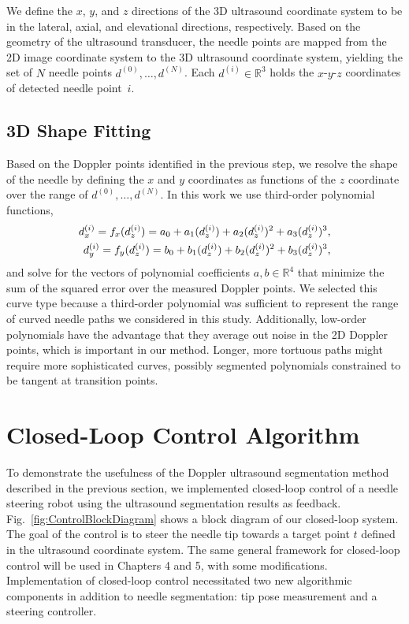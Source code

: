 We define the $x$, $y$, and $z$ directions of the 3D ultrasound coordinate system to be in the lateral, axial, and elevational directions, respectively. Based on the geometry of the ultrasound transducer, the needle points are mapped from the 2D image coordinate system to the 3D ultrasound coordinate system, yielding the set of $N$ needle points $d^{(0)}, \dotsc, d^{(N)}$. Each $d^{(i)} \in \mathbb{R}^{3}$ holds the $x$-$y$-$z$ coordinates of detected needle point~$i$.

\subsection{3D Shape Fitting}
Based on the Doppler points identified in the previous step, we resolve the shape of the needle by defining the $x$ and $y$ coordinates as functions of the $z$ coordinate over the range of $d^{(0)}, \dotsc, d^{(N)}$. In this work we use third-order polynomial functions,
\begin{align}
d^{(i)}_x = f_x(d_z^{(i)}) = a_0 + a_1(d_z^{(i)}) + a_2(d_z^{(i)})^{2} + a_3(d_z^{(i)})^{3},\notag\\
d^{(i)}_y = f_y(d_z^{(i)}) = b_0 + b_1(d_z^{(i)}) + b_2(d_z^{(i)})^{2} + b_3(d_z^{(i)})^{3},\label{result}
\end{align}
and solve for the vectors of polynomial coefficients $a,b \in \mathbb{R}^{4}$ that minimize the sum of the squared error over the measured Doppler points. We selected this curve type because a third-order polynomial was sufficient to represent the range of curved needle paths we considered in this study. Additionally, low-order polynomials have the advantage that they average out noise in the 2D Doppler points, which is important in our method. Longer, more tortuous paths might require more sophisticated curves, possibly segmented polynomials constrained to be tangent at transition points.

\section{Closed-Loop Control Algorithm}
\label{sec:Closed-loopControlDoppler}
To demonstrate the usefulness of the Doppler ultrasound segmentation method described in the previous section, we implemented closed-loop control of a needle steering robot using the ultrasound segmentation results as feedback. Fig.~\ref{fig:ControlBlockDiagram} shows a block diagram of our closed-loop system. The goal of the control is to steer the needle tip towards a target point ${t}$ defined in the ultrasound coordinate system. The same general framework for closed-loop control will be used in Chapters 4 and 5, with some modifications. Implementation of closed-loop control necessitated two new algorithmic components in addition to needle segmentation: tip pose measurement and a steering controller. 

